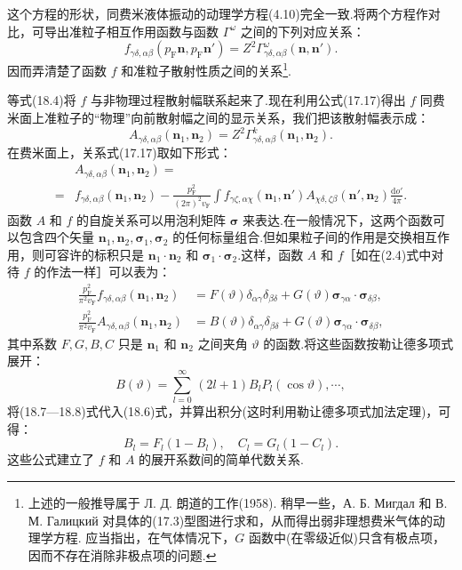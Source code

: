 这个方程的形状，同费米液体振动的动理学方程(4.10)完全一致.将两个方程作对比，可导出准粒子相互作用函数与函数 $\Gamma^{\omega}$ 之间的下列对应关系：
\begin{equation}
  f_{\gamma\delta,\alpha\beta}(p_{\mathrm{F}}\bm{n},p_{\mathrm{F}}\bm{n}')=Z^2\Gamma^{\omega}_{\gamma\delta,\alpha\beta}(\bm{n},\bm{n}').
\end{equation}
因而弄清楚了函数 $f$ 和准粒子散射性质之间的关系\footnote{上述的一般推导属于 Л. Д. 朗道的工作(1958). 稍早一些，А. Б. Мигдал 和 В. М. Галицкий 对具体的(17.3)型图进行求和，从而得出弱非理想费米气体的动理学方程. 应当指出，在气体情况下，$G$ 函数中(在零级近似)只含有极点项，因而不存在消除非极点项的问题.}.

等式(18.4)将 $f$ 与非物理过程散射幅联系起来了.现在利用公式(17.17)得出 $f$ 同费米面上准粒子的“物理”向前散射幅之间的显示关系，我们把该散射幅表示成：
\begin{equation}
  A_{\gamma\delta,\alpha\beta}(\bm{n}_1,\bm{n}_2)=Z^2\Gamma^{k}_{\gamma\delta,\alpha\beta}(\bm{n}_1,\bm{n}_2).
\end{equation}
在费米面上，关系式(17.17)取如下形式：
\begin{equation}
\begin{aligned}
  &A_{\gamma\delta,\alpha\beta}(\bm{n}_1,\bm{n}_2)=\\
  ={}&f_{\gamma\delta,\alpha\beta}(\bm{n}_1,\bm{n}_2)-\frac{p_{\mathrm{F}}^2}{(2\pi)^2v_{\mathrm{F}}}\int f_{\gamma\zeta,\alpha\chi}(\bm{n}_1,\bm{n}')A_{\chi\delta,\zeta\beta}(\bm{n}',\bm{n}_2)\frac{\mathrm{d}o'}{4\pi}.
\end{aligned}
\end{equation}
函数 $A$ 和 $f$ 的自旋关系可以用泡利矩阵 $\bm{\sigma}$ 来表达.在一般情况下，这两个函数可以包含四个矢量 $\bm{n}_1,\bm{n}_2,\bm{\sigma}_1,\bm{\sigma}_2$ 的任何标量组合.但如果粒子间的作用是交换相互作用，则可容许的标积只是 $\bm{n}_1\cdot\bm{n}_2$ 和 $\bm{\sigma}_1\cdot\bm{\sigma}_2$.这样，函数 $A$ 和 $f$［如在(2.4)式中对待 $f$ 的作法一样］可以表为：
\begin{equation}
\begin{aligned}
  \frac{p_{\mathrm{F}}^2}{\pi^2v_{\mathrm{F}}}f_{\gamma\delta,\alpha\beta}(\bm{n}_1,\bm{n}_2)&=F(\vartheta)\delta_{\alpha\gamma}\delta_{\beta\delta}+G(\vartheta)\bm{\sigma}_{\gamma\alpha}\cdot\bm{\sigma}_{\delta\beta},\\
  \frac{p_{\mathrm{F}}^2}{\pi^2v_{\mathrm{F}}}A_{\gamma\delta,\alpha\beta}(\bm{n}_1,\bm{n}_2)&=B(\vartheta)\delta_{\alpha\gamma}\delta_{\beta\delta}+G(\vartheta)\bm{\sigma}_{\gamma\alpha}\cdot\bm{\sigma}_{\delta\beta},
\end{aligned}
\end{equation}
其中系数 $F,G,B,C$ 只是 $\bm n_1$ 和 $\bm n_2$ 之间夹角 $\vartheta$ 的函数.将这些函数按勒让德多项式展开：
\begin{equation}
  B(\vartheta)=\sum_{l=0}^{\infty}\,(2l+1)B_lP_l(\cos\vartheta),\cdots,
\end{equation}
将(18.7—18.8)式代入(18.6)式，并算出积分(这时利用勒让德多项式加法定理)，可得：
\begin{equation}
  B_l=F_l(1-B_l),\quad C_l=G_l(1-C_l).
\end{equation}
这些公式建立了 $f$ 和 $A$ 的展开系数间的简单代数关系.

